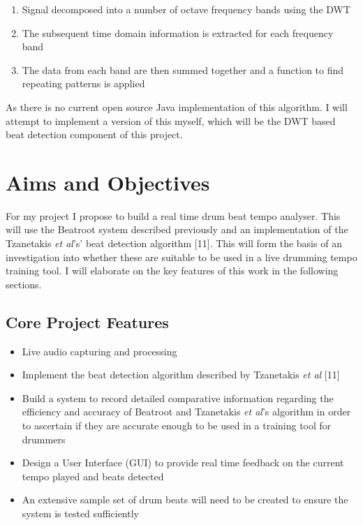 \documentclass[a4paper, 11pt]{article}
\begin{document}
\begin{enumerate}
\item Signal decomposed into a number of octave frequency bands using the DWT
\item The subsequent time domain information is extracted for each frequency band
\item The data from each band are then summed together and a function to find repeating patterns is applied
\end{enumerate}

As there is no current open source Java implementation of this algorithm. I will attempt to implement a version of this myself, which will be the DWT based beat detection component of this project.

\maketitle{}
\section{Aims and Objectives}
For my project I propose to build a real time drum beat tempo analyser. This will use the Beatroot system described previously and an implementation of the Tzanetakis \textit{et al}'s' beat detection algorithm [11]. This will form the basis of an investigation into whether these are suitable to be used in a live drumming tempo training tool. I will elaborate on the key features of this work in the following sections.


\subsection{Core Project Features}
\begin{itemize}
\item Live audio capturing and processing
\item Implement the beat detection algorithm described by Tzanetakis \textit{et al} [11] 
\item Build a system to record detailed comparative information regarding the efficiency and accuracy of Beatroot and Tzanetakis \textit{et al}'s algorithm in order to ascertain if they are accurate enough to be used in a training tool for drummers
\item Design a User Interface (GUI) to provide real time feedback on the current tempo played and beats detected
\item An extensive sample set of drum beats will need to be created to ensure the system is tested sufficiently
\end{itemize}
\end{document}
